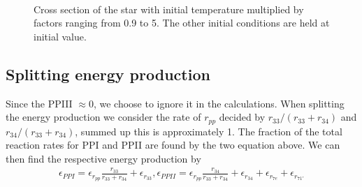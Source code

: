 \documentclass[a4paper,10pt]{article}
\begin{document}
\begin{figure}[H]
\centering
{}
 \\
\caption{Cross section of the star with initial temperature multiplied by factors ranging from 0.9 to 5. The other initial conditions are held at initial value.}
\label{fig:T_vary}
\end{figure}

\subsection{Splitting energy production}
Since the PPIII $\approx 0$, we choose to ignore it in the calculations. When splitting the energy production we consider the rate of $r_{pp}$ decided by $r_{33}/(r_{33} + r_{34})$ and $r_{34}/(r_{33} + r_{34})$, summed up this is approximately 1. The fraction of the total reaction rates for PPI and PPII are found by the two equation above. We can then find the respective energy production by 
\begin{align*}
\epsilon_{PPI} = \epsilon_{r_{pp}} \frac{r_{33}}{r_{33} + r_{34}} + \epsilon_{r_{33}}, 	\epsilon_{PPII} = \epsilon_{r_{pp}} \frac{r_{34}}{r_{33} + r_{34}} + \epsilon_{r_{34}} + \epsilon_{r_{7e}} + \epsilon_{r_{71'}} 
\end{align*}
%
\end{document}
